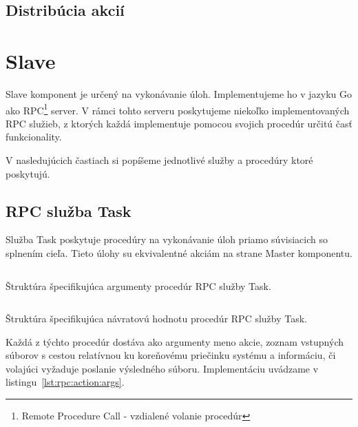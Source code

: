\subsection{Distrib\'{u}cia akci\'{i}}
\label{sec:master:distribution}


\section{Slave}
\label{sec:slave}

Slave komponent je určený na vykonávanie úloh. Implementujeme ho v jazyku Go
ako RPC\footnote{Remote Procedure Call - vzdialené volanie procedúr} server.
V rámci tohto serveru poskytujeme niekoľko implementovaných RPC služieb,
z ktorých každá implementuje pomocou svojich procedúr určitú časť funkcionality.

V nasledujúcich častiach si popíšeme jednotlivé služby a procedúry ktoré
poskytujú.

\subsection{RPC služba Task}
\label{sec:slave:rpc:action}

Služba Task poskytuje procedúry na vykonávanie úloh priamo súvisiacich so
splnením cieľa. Tieto úlohy su ekvivalentné akciám na strane Master komponentu.

\begin{listing}[H]
  \inputminted[frame=lines,framesep=2mm,linenos,fontsize=\scriptsize,firstline=3,lastline=7]{go}{/home/pepol/src/imterra/forge/proto/proto.go}
  \caption[Argumenty služby Task]{Štruktúra špecifikujúca argumenty procedúr RPC služby Task.}
  \label{lst:rpc:action:args}
\end{listing}

\begin{listing}[H]
  \inputminted[frame=lines,framesep=2mm,linenos,fontsize=\scriptsize,firstline=9,lastline=12]{go}{/home/pepol/src/imterra/forge/proto/proto.go}
  \caption[Návratová hodnota služby Task]{Štruktúra špecifikujúca návratovú hodnotu procedúr RPC služby Task.}
  \label{lst:rpc:action:response}
\end{listing}

Každá z týchto procedúr dostáva ako argumenty meno akcie, zoznam vstupných súborov
s cestou relatívnou ku koreňovému priečinku systému a informáciu, či volajúci
vyžaduje poslanie výsledného súboru. Implementáciu uvádzame v listingu~\ref{lst:rpc:action:args}.

